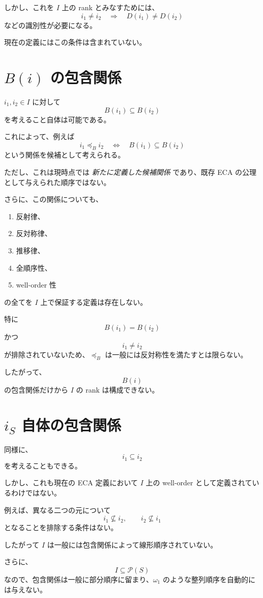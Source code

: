 \documentclass[a4paper,11pt]{article}
\begin{document}
しかし、これを $I$ 上の rank とみなすためには、
\[
i_1\neq i_2
\quad\Longrightarrow\quad
D(i_1)\neq D(i_2)
\]
などの識別性が必要になる。

現在の定義にはこの条件は含まれていない。

\section{$B(i)$ の包含関係}

$i_1,i_2\in I$ に対して
\[
B(i_1)\subseteq B(i_2)
\]
を考えること自体は可能である。

これによって、例えば
\[
i_1\preceq_B i_2
\quad\Longleftrightarrow\quad
B(i_1)\subseteq B(i_2)
\]
という関係を候補として考えられる。

ただし、これは現時点では \emph{新たに定義した候補関係} であり、既存 ECA の公理として与えられた順序ではない。

さらに、この関係についても、

\begin{enumerate}[label=(\arabic*)]
\item 反射律、
\item 反対称律、
\item 推移律、
\item 全順序性、
\item well-order 性
\end{enumerate}

の全てを $I$ 上で保証する定義は存在しない。

特に
\[
B(i_1)=B(i_2)
\]
かつ
\[
i_1\neq i_2
\]
が排除されていないため、$\preceq_B$ は一般には反対称性を満たすとは限らない。

したがって、
\[
B(i)
\]
の包含関係だけから $I$ の rank は構成できない。

\section{$i_S$ 自体の包含関係}

同様に、
\[
i_1\subseteq i_2
\]
を考えることもできる。

しかし、これも現在の ECA 定義において $I$ 上の well-order として定義されているわけではない。

例えば、異なる二つの元について
\[
i_1\nsubseteq i_2,
\qquad
i_2\nsubseteq i_1
\]
となることを排除する条件はない。

したがって $I$ は一般には包含関係によって線形順序されていない。

さらに、
\[
I\subseteq\mathcal{P}(S)
\]
なので、包含関係は一般に部分順序に留まり、$\omega_1$ のような整列順序を自動的には与えない。
\end{document}
